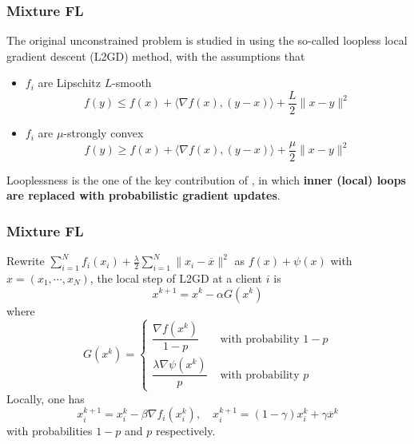 
\begin{frame}
\frametitle{Mixture FL}

The original unconstrained problem is studied in \cite{hanzely2020federated} using the so-called {\color{red} loopless} local gradient descent (L2GD) method, with the assumptions that
\begin{itemize}
    \item $f_i$ are Lipschitz $L$-smooth
    $$f(y) \leqslant f(x) + \langle \nabla f(x), (y-x)\rangle + \dfrac{L}{2} \lVert x-y \rVert^2$$
    \item $f_i$ are $\mu$-strongly convex
    $$f(y) \geqslant f(x) + \langle \nabla f(x), (y-x)\rangle + \dfrac{\mu}{2} \lVert x-y \rVert^2$$
\end{itemize}

{\color{red} Looplessness} is the one of the key contribution of \cite{hanzely2020federated}, in which {\bfseries inner (local) loops are replaced with probabilistic gradient updates}.

\end{frame}


\begin{frame}
\frametitle{Mixture FL}

Rewrite $\sum\limits_{i=1}^N f_i(x_i) + \frac{\lambda}{2} \sum\limits_{i=1}^N \lVert x_i - \overline{x} \rVert^2$ as $f(x) + \psi(x)$ with $x = (x_1,\cdots,x_N)$, the local step of L2GD at a client $i$ is
$$x^{k+1} = x^k - \alpha G(x^k)$$
where
$$
G(x^k) = \begin{cases}
\dfrac{\nabla f(x^k)}{1-p} & \text{ with probability } 1-p \\
\dfrac{\lambda \nabla \psi(x^k)}{p} & \text{ with probability } p 
\end{cases}
$$
Locally, one has
$$x_i^{k+1} = x_i^k - \beta \nabla f_i(x_i^k), \quad x_i^{k+1} = (1-\gamma)x_i^k + \gamma \overline{x}^k$$
with probabilities $1-p$ and $p$ respectively.

\end{frame}


